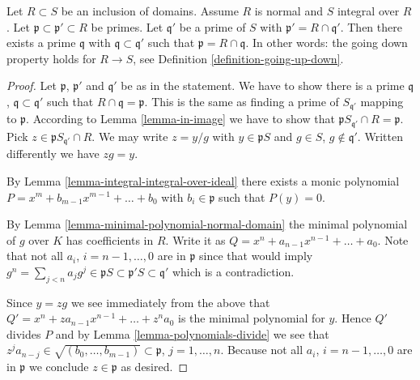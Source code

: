 \begin{proposition}
\label{proposition-going-down-normal-integral}
Let $R \subset S$ be an inclusion of domains.
Assume $R$ is normal and $S$ integral over $R$.
Let $\mathfrak p \subset \mathfrak p' \subset R$
be primes. Let $\mathfrak q'$ be a prime of $S$
with $\mathfrak p' = R \cap \mathfrak q'$.
Then there exists a prime $\mathfrak q$
with $\mathfrak q \subset \mathfrak q'$
such that $\mathfrak p = R \cap \mathfrak q$. In other words:
the going down property holds for $R \to S$, see
Definition \ref{definition-going-up-down}.
\end{proposition}

\begin{proof}
Let $\mathfrak p$, $\mathfrak p'$ and $\mathfrak q'$
be as in the statement. We have to show there is a prime
$\mathfrak q$, $\mathfrak q \subset \mathfrak q'$ such that
$R \cap \mathfrak q = \mathfrak p$. This is the same
as finding a prime of
$S_{\mathfrak q'}$ mapping to $\mathfrak p$.
According to Lemma \ref{lemma-in-image} we have to show
that $\mathfrak p S_{\mathfrak q'} \cap R
= \mathfrak p$. Pick $z \in \mathfrak p S_{\mathfrak q'} \cap R$.
We may write $z = y/g$ with $y \in \mathfrak pS$ and 
$g \in S$, $g \not\in \mathfrak q'$. Written
differently we have $zg = y$.

\medskip\noindent
By Lemma \ref{lemma-integral-integral-over-ideal}
there exists a monic polynomial
$P = x^m + b_{m-1} x^{m-1} + \ldots + b_0$
with $b_i \in \mathfrak p$ such that $P(y) = 0$.

\medskip\noindent
By Lemma \ref{lemma-minimal-polynomial-normal-domain}
the minimal polynomial of $g$ over $K$ has coefficients
in $R$. Write it as $Q = x^n + a_{n-1} x^{n-1} + \ldots
+ a_0$. Note that not all $a_i$, $i=n-1,\ldots,0$
are in $\mathfrak p$ since that would imply 
$g^n = \sum_{j < n} a_j g^j \in \mathfrak pS
\subset \mathfrak p'S
\subset \mathfrak q'$
which is a contradiction.

\medskip\noindent
Since $y = zg$ we see immediately from the above
that $Q' = x^n + za_{n-1} x^{n-1} + \ldots + z^{n}a_0$
is the minimal polynomial for $y$. Hence
$Q'$ divides $P$ and by Lemma \ref{lemma-polynomials-divide}
we see that $z^ja_{n - j} \in \sqrt{(b_0,\ldots,b_{m-1})} 
\subset \mathfrak p$, $j =  1, \ldots, n$.
Because not all $a_i$, $i=n-1,\ldots,0$
are in $\mathfrak p$ we conclude $z \in \mathfrak p$
as desired.
\end{proof}






































